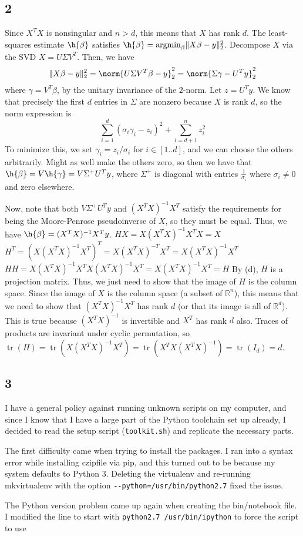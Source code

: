 \documentclass{article}
\DeclareMathOperator{\tr}{tr}
\newcommand{\rn}{\mathbb{R}}
\begin{document}
\subsection*{2}
Since $X^TX$ is nonsingular and $n>d$, this means that $X$ has rank $d$. The least-squares estimate $\h{\beta}$ satisfies $\h{\beta}=\text{argmin}_\beta\|X\beta-y\|_2^2$. Decompose $X$ via the SVD $X=U\Sigma V^T$. Then, we have 
\[\|X\beta-y\|_2^2=\norm{U\Sigma V^T\beta-y}_2^2=\norm{\Sigma \gamma-U^Ty}_2^2\]
where $\gamma=V^T\beta$, by the unitary invariance of the $2$-norm. Let $z=U^Ty$. We know that precisely the first $d$ entries in $\Sigma $ are nonzero because $X$ is rank $d$, so the norm expression is 
\[\sum_{i=1}^d(\sigma_i\gamma_i-z_i)^2+\sum_{i=d+1}^nz_i^2\]
To minimize this, we set $\gamma_i=z_i/\sigma_i$ for $i\in[1..d]$, and we can choose the others arbitrarily. Might as well make the others zero, so then we have that $\h{\beta}=V\h{\gamma}=V\Sigma^+U^Ty$, where $\Sigma^+$ is diagonal with entries $\frac{1}{\sigma_i}$ where $\sigma_i\neq0$ and zero elsewhere.

Now, note that both $V\Sigma^+U^Ty$ and $(X^TX)^{-1}X^T$ satisfy the requirements for being the Moore-Penrose pseudoinverse of $X$, so they must be equal. Thus, we have $\h{\beta}=(X^TX)^{-1}X^Ty$.
$HX=X(X^TX)^{-1}X^TX=X$
$H^T=(X(X^TX)^{-1}X^T)^T=X(X^TX)^{-T}X^T=X(X^TX)^{-1}X^T$
$HH=X(X^TX)^{-1}X^TX(X^TX)^{-1}X^T=X(X^TX)^{-1}X^T=H$
By (d), $H$ is a projection matrix. Thus, we just need to show that the image of $H$ is the column space. Since the image of $X$ is the column space (a subset of $\rn^n$), this means that we need to show that $(X^TX)^{-1}X^T$ has rank $d$ (or that its image is all of $\rn^d$). This is true because $(X^TX)^{-1}$ is invertible and $X^T$ has rank $d$ also. 
Traces of products are invariant under cyclic permutation, so $\tr(H)=\tr(X(X^TX)^{-1}X^T)=\tr(X^TX(X^TX)^{-1})=\tr(I_d)=d$.
\subsection*{3}
I have a general policy against running unknown scripts on my computer, and since I know that I have a large part of the Python toolchain set up already, I decided to read the setup script (\verb|toolkit.sh|) and replicate the necessary parts. 

The first difficulty came when trying to install the packages. I ran into a syntax error while installing czipfile via pip, and this turned out to be because my system defaults to Python 3. Deleting the virtualenv and re-running mkvirtualenv with the option \verb|--python=/usr/bin/python2.7| fixed the issue.

The Python version problem came up again when creating the bin/notebook file. I modified the line to start with \verb|python2.7 /usr/bin/ipython| to force the script to use 
\end{document}
